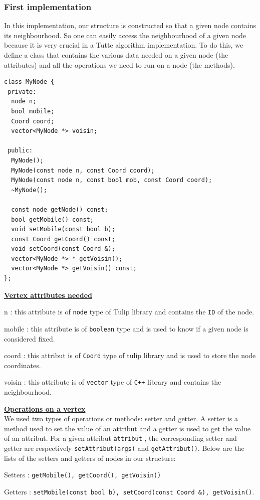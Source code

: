 \subsubsection{First implementation}
In this implementation, our structure is constructed so that a given node
contains its neighbourhood. So one can easily access the neighbourhood
of a given node because it is very crucial in a Tutte algorithm
implementation. To do this, we define a class that contains the various
data needed on a given node (the attributes) and all the operations we
need to run on a node (the methods).

\newpage
\begin{lstlisting}
class MyNode {
 private:
  node n;
  bool mobile;
  Coord coord;  
  vector<MyNode *> voisin;

 public:
  MyNode();
  MyNode(const node n, const Coord coord);
  MyNode(const node n, const bool mob, const Coord coord);
  ~MyNode();
  
  const node getNode() const;
  bool getMobile() const;
  void setMobile(const bool b);
  const Coord getCoord() const;
  void setCoord(const Coord &);
  vector<MyNode *> * getVoisin();
  vector<MyNode *> getVoisin() const;
};
\end{lstlisting}
\noindent
\underline{\bf Vertex attributes needed}
\begin{dinglist}{70}
\item[n]: this attribute is of \texttt{node} type of \textsf{Tulip} library and contains the \texttt{ID} of the node.  
\item[mobile]: this attribute is of \texttt{boolean} type and is used to know if a given node is considered fixed.
\item[coord]: this attribut is of \texttt{Coord} type of \textsf{tulip} library and is used to store the node coordinates. 
\item[voisin]: this attribute is of \texttt{vector} type of \texttt{C++} library and contains the neighbourhood.
\end{dinglist}
\noindent
\underline{\bf Operations on a vertex}~\\
We used two types of operations or methods: \textsf{setter} and
\textsf{getter}. A \textsf{setter} is a method used to set the value
of an attribut and a \textsf{getter} is used to get the value of an
attribut. For a given attribut \texttt{attribut} , the corresponding
setter and getter are respectively \verb+setAttribut(args)+ and \verb+getAttribut()+. Below are the lists of the setters and getters of nodes in our structure:
\begin{dinglist}{70}
\item[Setters]: \verb+getMobile(), getCoord(), getVoisin()+  
\item[Getters]: \verb+setMobile(const bool b), setCoord(const Coord &), getVoisin()+.
\end{dinglist}

